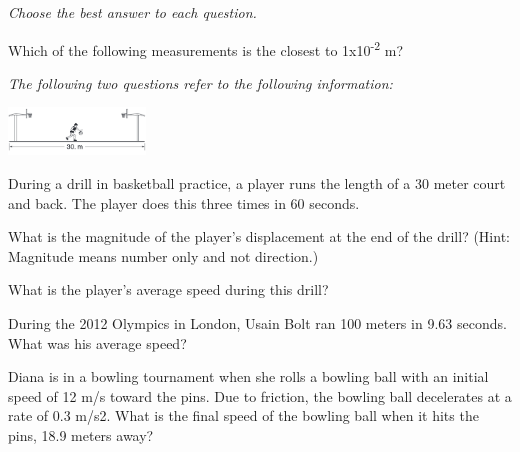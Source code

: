 \documentclass[10pt]{examdesign}
\begin{document}
\begin{multiplechoice} [title={Multiple Choice},
	rearrange=yes]
\textit{Choose the best answer to each question.}

	
	\begin{question}
Which of the following measurements is the closest to 1x10\textsuperscript{-2} m? 

	\end{question}



\begin{block}
 \textit{	The following two questions refer to the following information:}
 	
\includegraphics[height=0.5in]{bball.png} 

During a drill in basketball practice, a player runs the length of a 30 meter court and back.  The player does this three times in 60 seconds. 

\begin{question}
	What is the magnitude of the player's displacement at the end of the drill? (Hint: Magnitude means number only and not direction.)
	\choice{0 m}
	\choice{30 m}
	\choice{60 m}
	\choice{180 m}
\end{question}


	\begin{question}
What is the player's average speed during this drill? 
\end{question}
\end{block}


\begin{question}
During the 2012 Olympics in London, Usain Bolt ran 100 meters in 9.63 seconds.  What was his average speed? 

	
\end{question}


\begin{question}
Diana is in a bowling tournament when she rolls a bowling ball with an initial speed of 12 m/s toward the pins.  Due to friction, the bowling ball decelerates at a rate of 0.3 m/s2.  What is the final speed of the bowling ball when it hits the pins, 18.9 meters away?


\end{question}
\end{multiplechoice}
\end{document}
